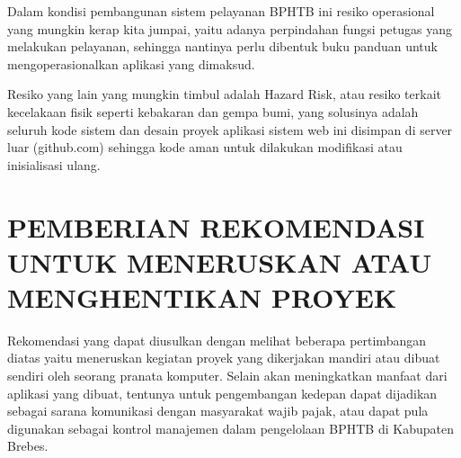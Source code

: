 \documentclass[pdftex,12pt, oneside]{article}
\begin{document}
Dalam kondisi pembangunan sistem pelayanan BPHTB ini resiko operasional yang mungkin kerap kita jumpai, yaitu adanya perpindahan fungsi petugas yang melakukan pelayanan, sehingga nantinya perlu dibentuk buku panduan untuk mengoperasionalkan aplikasi yang dimaksud.

Resiko yang lain yang mungkin timbul adalah Hazard Risk, atau resiko terkait kecelakaan fisik seperti kebakaran dan gempa bumi, yang solusinya adalah seluruh kode sistem dan desain proyek aplikasi sistem web ini disimpan di server luar (github.com) sehingga kode aman untuk dilakukan modifikasi atau inisialisasi ulang.

\section{PEMBERIAN REKOMENDASI UNTUK MENERUSKAN ATAU MENGHENTIKAN PROYEK}

Rekomendasi yang dapat diusulkan dengan melihat beberapa pertimbangan diatas yaitu meneruskan kegiatan proyek yang dikerjakan mandiri atau dibuat sendiri oleh seorang pranata komputer. Selain akan meningkatkan manfaat dari aplikasi yang dibuat, tentunya untuk pengembangan kedepan dapat dijadikan sebagai sarana komunikasi dengan masyarakat wajib pajak, atau dapat pula digunakan sebagai kontrol manajemen dalam pengelolaan BPHTB di Kabupaten Brebes.
\end{document}
